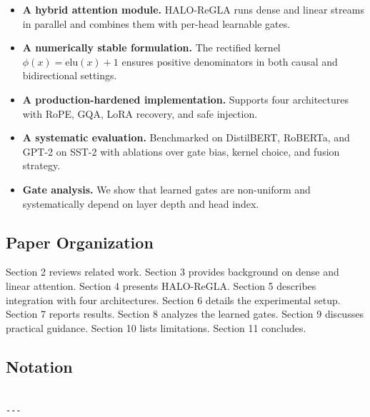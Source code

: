 \begin{itemize}
\item \textbf{A hybrid attention module.} HALO-ReGLA runs dense and linear streams
  in parallel and combines them with per-head learnable gates.
\item \textbf{A numerically stable formulation.} The rectified kernel
  $\phi(x) = \mathrm{elu}(x) + 1$ ensures positive denominators in both
  causal and bidirectional settings.
\item \textbf{A production-hardened implementation.} Supports four architectures
  with RoPE, GQA, LoRA recovery, and safe injection.
\item \textbf{A systematic evaluation.} Benchmarked on DistilBERT, RoBERTa, and GPT-2
  on SST-2 with ablations over gate bias, kernel choice, and fusion strategy.
\item \textbf{Gate analysis.} We show that learned gates are non-uniform and
  systematically depend on layer depth and head index.

\end{itemize}
\subsection{Paper Organization}

Section 2 reviews related work. Section 3 provides background on dense and 
linear attention. Section 4 presents HALO-ReGLA. Section 5 describes 
integration with four architectures. Section 6 details the experimental 
setup. Section 7 reports results. Section 8 analyzes the learned gates. 
Section 9 discusses practical guidance. Section 10 lists limitations. 
Section 11 concludes.



\subsection{Notation}

\begin{lstlisting}

---
\end{lstlisting}